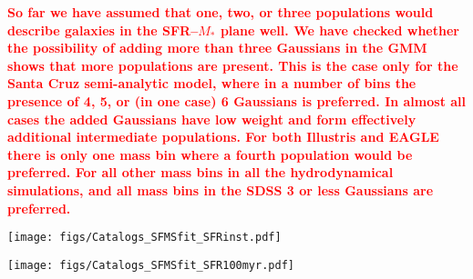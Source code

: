 \documentclass[preprint2,tighten]{aastex62}
\newcommand{\todo}[1]{{\bf \textcolor{red}{ #1}}}
\begin{document}
\todo{So far we have assumed that one, two, or three populations would describe galaxies in the SFR--$M_*$ plane well. We have checked whether the possibility of adding more than three Gaussians in the GMM shows that more populations are present. This is the case only for the Santa Cruz semi-analytic model, where in a number of bins the presence of 4, 5, or (in one case) 6 Gaussians is preferred. In almost all cases the added Gaussians have low weight and form effectively additional intermediate populations. For both Illustris and EAGLE there is only one mass bin where a fourth population would be preferred. For all other mass bins in all the hydrodynamical simulations, and all mass bins in the SDSS 3 or less Gaussians are preferred.}
\begin{figure*}
\begin{center}
\texttt{[image: figs/Catalogs\_SFMSfit\_SFRinst.pdf]} 
\caption{Best-fit SFMS of the central galaxies in the Illustris, EAGLE, MUFASA, 
and Santa Cruz SAM simulations as identified by our SFMS fitting method 
(Section~\ref{sec:sfmsfit}). The SFMSs above are fit from the instantaneous 
SFR to $M_*$ relation. We compare the SFMS fits to one another in the bottom 
right panel. For reference, we include the best-fit SFMS of the SDSS sample 
in the top right panel. \emph{The SFMSs of the simulations have similar 
slopes -- i.e. stellar mass dependence. Their amplitude, however, roughly 
vary by an order of magnitude.}} \label{fig:sfmsfit_inst}
\end{center}
\end{figure*}

\begin{figure*}
\begin{center}
\texttt{[image: figs/Catalogs\_SFMSfit\_SFR100myr.pdf]} 
\caption{Same as Figure~\ref{fig:sfmsfit_inst} but for the SFR-$M_*$ relation 
using SFR averaged over $100\,\mathrm{Myr}$. As in   
Figure~\ref{fig:sfmsfit_inst}, \emph{the SFMSs of the simulations have similar 
slopes but vary roughly by an order of magnitude in amplitude.}}
\label{fig:sfmsfit_100myr}
\end{center}
\end{figure*}
\end{document}

